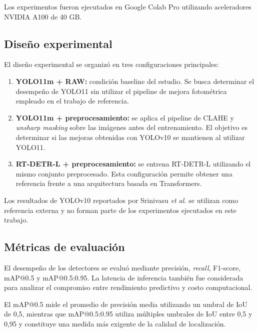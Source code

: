 \documentclass[conference]{IEEEtran}
\begin{document}
Los experimentos fueron ejecutados en Google Colab Pro utilizando aceleradores NVIDIA A100 de 40 GB.


\subsection{Diseño experimental}

El diseño experimental se organizó en tres configuraciones principales:

\begin{enumerate}
    \item \textbf{YOLO11m + RAW:} condición baseline del estudio. Se busca determinar el desempeño de YOLO11 sin utilizar el pipeline de mejora fotométrica empleado en el trabajo de referencia.
    
    \item \textbf{YOLO11m + preprocesamiento:} se aplica el pipeline de CLAHE y \textit{unsharp masking} sobre las imágenes antes del entrenamiento. El objetivo es determinar si las mejoras obtenidas con YOLOv10 se mantienen al utilizar YOLO11.
    
    \item \textbf{RT-DETR-L + preprocesamiento:} se entrena RT-DETR-L utilizando el mismo conjunto preprocesado. Esta configuración permite obtener una referencia frente a una arquitectura basada en Transformers.
\end{enumerate}

Los resultados de YOLOv10 reportados por Srinivasu \textit{et al.} \cite{b3_srinivasu} se utilizan como referencia externa y no forman parte de los experimentos ejecutados en este trabajo.


\subsection{Métricas de evaluación}

El desempeño de los detectores se evaluó mediante precisión, \textit{recall}, F1-score, mAP@0.5 y mAP@0.5:0.95. La latencia de inferencia también fue considerada para analizar el compromiso entre rendimiento predictivo y costo computacional.

El mAP@0.5 mide el promedio de precisión media utilizando un umbral de IoU de 0,5, mientras que mAP@0.5:0.95 utiliza múltiples umbrales de IoU entre 0,5 y 0,95 y constituye una medida más exigente de la calidad de localización.


\end{document}
